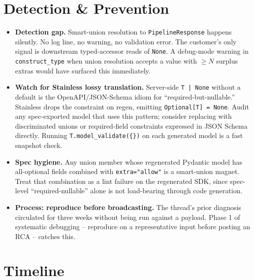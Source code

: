 \documentclass[11pt]{article}
\begin{document}
\section{Detection \& Prevention}

\begin{itemize}
  \item \textbf{Detection gap.} Smart-union resolution to \texttt{PipelineResponse} happens silently. No log line, no warning, no validation error. The customer's only signal is downstream typed-accessor reads of \texttt{None}. A debug-mode warning in \texttt{construct\_type} when union resolution accepts a value with $\geq N$ surplus extras would have surfaced this immediately.
  \item \textbf{Watch for Stainless lossy translation.} Server-side \texttt{T | None} without a default is the OpenAPI/JSON-Schema idiom for ``required-but-nullable.'' Stainless drops the constraint on regen, emitting \texttt{Optional[T] = None}. Audit any spec-exported model that uses this pattern; consider replacing with discriminated unions or required-field constraints expressed in JSON Schema directly. Running \texttt{T.model\_validate(\{\})} on each generated model is a fast snapshot check.
  \item \textbf{Spec hygiene.} Any union member whose regenerated Pydantic model has all-optional fields combined with \texttt{extra="allow"} is a smart-union magnet. Treat that combination as a lint failure on the regenerated SDK, since spec-level ``required-nullable'' alone is not load-bearing through code generation.
  \item \textbf{Process: reproduce before broadcasting.} The thread's prior diagnosis circulated for three weeks without being run against a payload. Phase 1 of systematic debugging -- reproduce on a representative input before posting an RCA -- catches this.
\end{itemize}

\section{Timeline}
\end{document}
